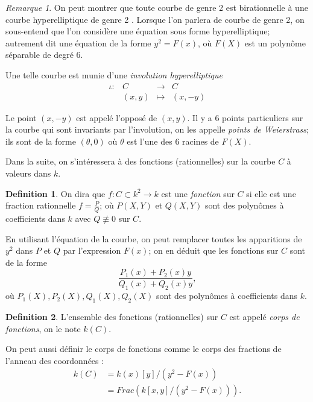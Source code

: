 \documentclass[a4paper,12pt]{article}
\theoremstyle{definition}
\newtheorem{definition}{Definition}[section]
\theoremstyle{remark}
\newtheorem{remarque}{Remarque}
\numberwithin{equation}{section}
\begin{document}
\begin{remarque}
On peut montrer que toute courbe de genre 2 est birationnelle à une courbe hyperelliptique de genre 2 \citep{cassels-Flynn}. Lorsque l'on parlera de courbe de genre 2, on sous-entend que l'on considère une équation sous forme hyperelliptique; autrement dit une équation de la forme $y^2 = F(x)$, où $F(X)$ est un polynôme séparable de degré 6.
\end{remarque}

Une telle courbe est munie d'une \emph{involution hyperelliptique}
\begin{equation*}
\begin{array}{lrcl}
\iota :&C & \longrightarrow & C \\
& (x,y) & \longmapsto & (x,-y)
\end{array}
\end{equation*}

Le point $(x,-y)$ est appelé l'opposé de $(x,y)$. Il y a 6 points particuliers sur la courbe qui sont invariants par l'involution, on les appelle \emph{points de Weierstrass}; ils sont de la forme $(\theta,0)$ où $\theta$ est l'une des 6 racines de $F(X)$.

Dans la suite, on s'intéressera à des fonctions (rationnelles) sur la courbe $C$ à valeurs dans $k$.
\begin{definition}
On dira que $f : C \subset k^2 \longrightarrow k$ est une \emph{fonction} sur $C$ si elle est une fraction rationnelle $f = \frac{P}{Q}$; où $P(X,Y)$ et $Q(X,Y)$ sont des polynômes à coefficients dans $k$ avec $Q \not\equiv 0$ sur $C$.
\end{definition}

En utilisant l'équation de la courbe, on peut remplacer toutes les apparitions de $y^2$ dans $P$ et $Q$ par l'expression $F(x)$; on en déduit que les fonctions sur $C$ sont de la forme
$$\frac{P_1(x) + P_2(x)y}{Q_1(x) + Q_2(x)y},$$
où $P_1(X),P_2(X),Q_1(X),Q_2(X)$ sont des polynômes à coefficients dans $k$.

\begin{definition}
L'ensemble des fonctions (rationnelles) sur $C$ est appelé \emph{corps de fonctions}, on le note $k(C)$.
\end{definition}

On peut aussi définir le corps de fonctions comme le corps des fractions de l'anneau des coordonnées :
\begin{align*}
k(C) &= k(x)[y]/(y^2-F(x)) \\
  &= Frac(k[x,y]/(y^2-F(x))).
\end{align*}
\end{document}
